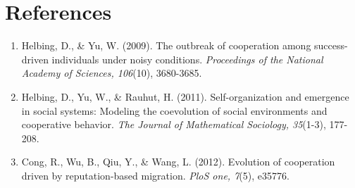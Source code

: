 \documentclass[11pt]{article}
\begin{document}
\section{References}

\begin{enumerate}
\item Helbing, D., \& Yu, W. (2009). The outbreak of cooperation among success-driven individuals under noisy conditions. \textit{Proceedings of the National Academy of Sciences, 106}(10), 3680-3685.
\item Helbing, D., Yu, W., \& Rauhut, H. (2011). Self-organization and emergence in social systems: Modeling the coevolution of social environments and cooperative behavior. \textit{The Journal of Mathematical Sociology, 35}(1-3), 177-208.
\item Cong, R., Wu, B., Qiu, Y., \& Wang, L. (2012). Evolution of cooperation driven by reputation-based migration. \textit{PloS one, 7}(5), e35776.
\end{enumerate}
\end{document}
